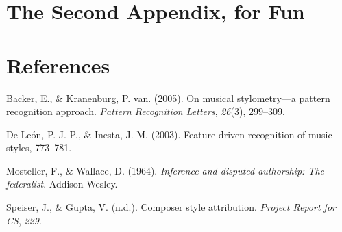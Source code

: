 \documentclass[12pt,twoside]{reedthesis}
\theoremstyle{definition}
\theoremstyle{definition}
\theoremstyle{definition}
\theoremstyle{remark}
\begin{document}
\chapter{The Second Appendix, for
Fun}\label{the-second-appendix-for-fun}

\backmatter

\chapter*{References}\label{references}


\noindent

\setlength{\parindent}{-0.20in} \setlength{\leftskip}{0.20in}
\setlength{\parskip}{8pt}

\hypertarget{refs}{}
\hypertarget{ref-backer2005}{}
Backer, E., \& Kranenburg, P. van. (2005). On musical stylometry---a
pattern recognition approach. \emph{Pattern Recognition Letters},
\emph{26}(3), 299--309.

\hypertarget{ref-de2003feature}{}
De León, P. J. P., \& Inesta, J. M. (2003). Feature-driven recognition
of music styles, 773--781.

\hypertarget{ref-mosteller1964inference}{}
Mosteller, F., \& Wallace, D. (1964). \emph{Inference and disputed
authorship: The federalist}. Addison-Wesley.

\hypertarget{ref-CompStyleAttri}{}
Speiser, J., \& Gupta, V. (n.d.). Composer style attribution.
\emph{Project Report for CS}, \emph{229}.


\end{document}
